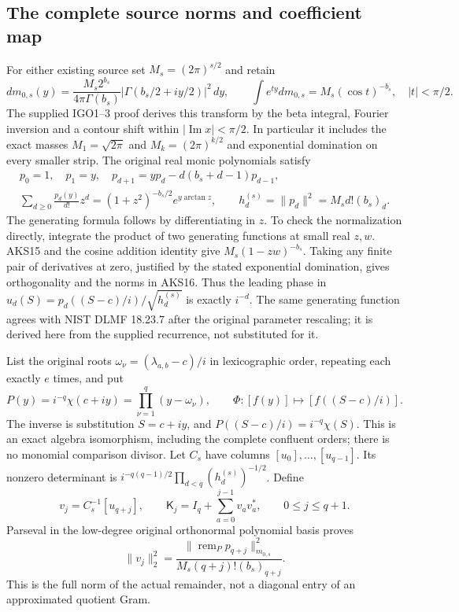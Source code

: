 \subsection{The complete source norms and coefficient map}
For either existing source set $M_s=(2\pi)^{s/2}$ and retain
\[
 dm_{0,s}(y)=\frac{M_s2^{b_s}}{4\pi\Gamma(b_s)}
           |\Gamma(b_s/2+iy/2)|^2\,dy,\qquad
 \int e^{ty}dm_{0,s}=M_s(\cos t)^{-b_s},\quad |t|<\pi/2.
 \tag{AKS15}
\]
The supplied IGO1--3 proof derives this transform by the beta integral,
Fourier inversion and a contour shift within $|\operatorname{Im}x|<\pi/2$.
In particular it includes the exact masses $M_1=\sqrt{2\pi}$ and
$M_k=(2\pi)^{k/2}$ and exponential domination on every smaller strip.
The original real monic polynomials satisfy
\[
\begin{gathered}
 p_0=1,\quad p_1=y,\quad
 p_{d+1}=yp_d-d(b_s+d-1)p_{d-1},\\
 \sum_{d\ge0}\frac{p_d(y)}{d!}z^d
      =(1+z^2)^{-b_s/2}e^{y\arctan z},\qquad
 h_d^{(s)}=\|p_d\|^2=M_s d!(b_s)_d.
\end{gathered}\tag{AKS16}
\]
The generating formula follows by differentiating in $z$. To check the
normalization directly, integrate the product of two generating
functions at small real $z,w$. AKS15 and the cosine addition identity
give $M_s(1-zw)^{-b_s}$. Taking any finite pair of derivatives at zero,
justified by the stated exponential domination, gives orthogonality and
the norms in AKS16. Thus the leading phase in
$u_d(S)=p_d((S-c)/i)/\sqrt{h_d^{(s)}}$ is exactly $i^{-d}$.
The same generating function agrees with NIST DLMF 18.23.7 after the
original parameter rescaling; it is derived here from the supplied
recurrence, not substituted for it.

List the original roots
$\omega_\nu=(\lambda_{a,b}-c)/i$ in lexicographic order, repeating each
exactly $e$ times, and put
\[
 P(y)=i^{-q}\chi(c+iy)=\prod_{\nu=1}^q(y-\omega_\nu),\qquad
 \Phi:[f(y)]\mapsto[f((S-c)/i)].
 \tag{AKS17}
\]
The inverse is substitution $S=c+iy$, and
$P((S-c)/i)=i^{-q}\chi(S)$. This is an exact algebra isomorphism, including
the complete confluent orders; there is no monomial comparison divisor.
Let $C_s$ have columns $[u_0],\ldots,[u_{q-1}]$. Its nonzero determinant
is $i^{-q(q-1)/2}\prod_{d<q}(h_d^{(s)})^{-1/2}$. Define
\[
 v_j=C_s^{-1}[u_{q+j}],\qquad
 \mathsf K_j=I_q+\sum_{a=0}^{j-1}v_av_a^*,\qquad 0\le j\le q+1.
 \tag{AKS18}
\]
Parseval in the low-degree original orthonormal polynomial basis proves
\[
 \|v_j\|_2^2=
 \frac{\|\operatorname{rem}_P p_{q+j}\|_{m_{0,s}}^2}
      {M_s(q+j)!(b_s)_{q+j}}.
 \tag{AKS19}
\]
This is the full norm of the actual remainder, not a diagonal entry of
an approximated quotient Gram.

